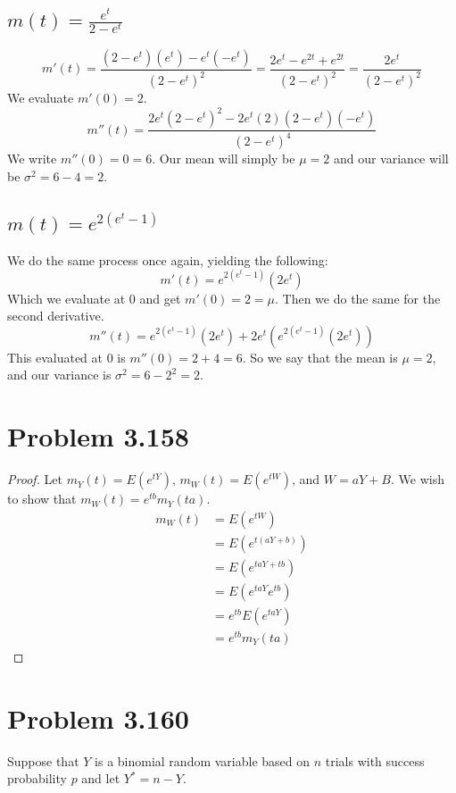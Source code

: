 \documentclass{article}
\begin{document}
    \subsection*{$m(t) = \frac{e^t}{2-e^t}$}
        \[
            m'(t) = \frac{(2-e^t)(e^t)-e^t(-e^t)}{(2-e^t)^2} = \frac{2e^t-e^{2t}+e^{2t}}{(2-e^t)^2} = \frac{2e^t}{(2-e^t)^2}
        \]
        We evaluate $m'(0) = 2$.
        \[
            m''(t) = \frac{2e^t(2-e^t)^2 - 2e^t(2)(2-e^t)(-e^t)}{(2-e^t)^4}
        \]
        We write $m''(0) = 0=6$.
        Our mean will simply be $\mu = 2$ and our variance will be $\sigma^2 = 6 - 4 = 2$.
    \subsection*{$m(t) = e^{2(e^t-1)}$}
    We do the same process once again, yielding the following:
    \[
        m'(t) = e^{2(e^t-1)}(2e^t)
    \]
    Which we evaluate at 0 and get $m'(0) = 2 = \mu$. Then we do the same for the second derivative.
    \[
        m''(t) = e^{2(e^t-1)}(2e^t)+2e^t(e^{2(e^t-1)}(2e^t))
    \]
    This evaluated at 0 is $m''(0) = 2 + 4 = 6$.
    So we say that the mean is $\mu = 2$, and our variance is $\sigma^2 = 6 - 2^2 = 2$.
\section*{Problem 3.158}
    \begin{proof}
        Let $m_Y(t) = E(e^{t Y})$, $m_W(t) = E(e^{t W})$, and $W = a Y + B$.
        We wish to show that $m_W(t) = e^{tb}m_Y(ta)$.
        \begin{align*}
            m_W(t) &= E(e^{t W})\\
            &=E(e^{t(a Y+b)})\\
            &=E(e^{t a Y + tb})\\
            &=E(e^{t a Y}e^{tb})\\
            &=e^{t b}E(e^{t a Y})\\
            &=e^{t b}m_Y(t a)
        \end{align*}
    \end{proof}
\section*{Problem 3.160}
    Suppose that $Y$ is a binomial random variable based on $n$ trials with success probability
    $p$ and let $Y^* = n - Y$.
\end{document}
